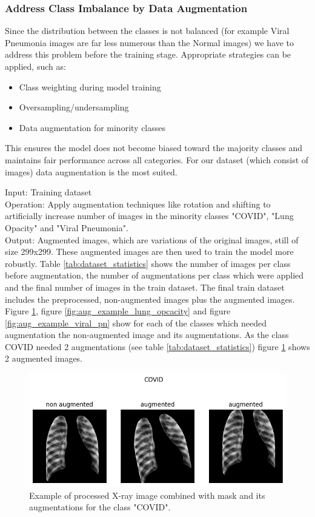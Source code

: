 \documentclass{article}
\begin{document}
\subsubsection{Address Class Imbalance by Data Augmentation} \label{augment}
Since the distribution between the classes is not balanced (for example Viral Pneumonia images are far less numerous than the Normal images) we have to address this problem 
before the training stage. Appropriate strategies can be applied, such as:
\begin{itemize}
    \item Class weighting during model training
    \item Oversampling/undersampling
    \item Data augmentation for minority classes
\end{itemize}
This ensures the model does not become biased toward the majority classes and maintains fair performance across all categories. For our dataset (which consist of images) data augmentation is the most suited.

Input: Training dataset \\%
Operation: Apply augmentation techniques like rotation and shifting to artificially increase number of images in the minority classes "COVID", "Lung Opacity" and 
"Viral Pneumonia".\\
Output: Augmented images, which are variations of the original images, still of size 299x299. These augmented images are then used to train the model more robustly. 
Table \ref{tab:dataset_statistics} shows the number of images per class before augmentation, the number of augmentations per class which were applied and the
final number of images in the train dataset. The final train dataset includes the preprocessed, non-augmented images plus the augmented images.\\
Figure \ref{fig:aug_example_covid}, figure \ref{fig:aug_example_lung_opcacity} and figure \ref{fig:aug_example_viral_pn} show for each of the classes which needed 
augmentation the non-augmented image and its augmentations. As the class COVID needed 2 augmentations (see table \ref{tab:dataset_statistics}) figure \ref{fig:aug_example_covid} 
shows 2 augmented images. 


\begin{figure}[!htb] %
    \centering
    \includegraphics[width=1.0\linewidth]{aug_example_covid.png}
    \caption{Example of processed X-ray image combined with mask and its augmentations for the class "COVID".}
    \label{fig:aug_example_covid}
\end{figure}
\end{document}
